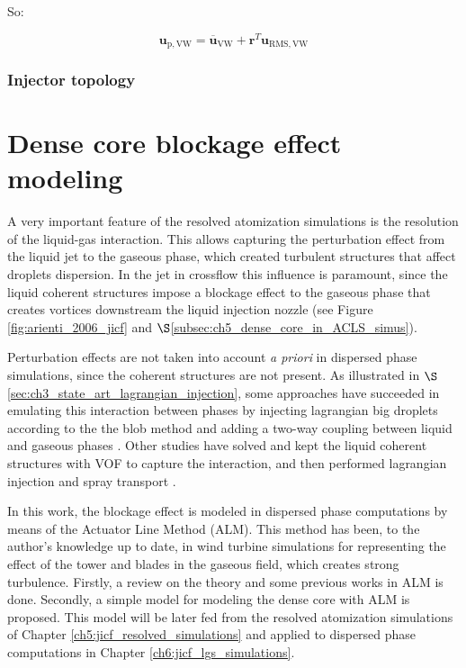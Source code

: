 So:

\begin{equation}
\boldsymbol{u}_\mathrm{p,VW} = \overline{\boldsymbol{u}}_\mathrm{VW}  + \boldsymbol{r}^T \boldsymbol{u}_\mathrm{RMS,VW} 
\end{equation}




\subsubsection*{Injector topology}



\section{Dense core blockage effect modeling}
	\label{sec:ch4_dense_core_modelling}
	
A very important feature of the resolved atomization simulations is the resolution of the liquid-gas interaction. This allows capturing the perturbation effect from the liquid jet to the gaseous phase, which created turbulent structures that affect droplets dispersion. In the jet in crossflow this influence is paramount, since the liquid coherent structures impose a blockage effect to the gaseous phase that creates vortices downstream the liquid injection nozzle (see Figure \ref{fig:arienti_2006_jicf} and $\S$\ref{subsec:ch5_dense_core_in_ACLS_simus}).

Perturbation effects are not taken into account \textsl{a priori} in dispersed phase simulations, since the coherent structures are not present. As illustrated in $\S$\ref{sec:ch3_state_art_lagrangian_injection}, some approaches have succeeded in emulating this interaction between phases by injecting lagrangian big droplets according to the the blob method  and adding a two-way coupling between liquid and gaseous phases . Other studies have solved and kept the liquid coherent structures with VOF to capture the interaction, and then performed lagrangian injection and spray transport .

In this work, the blockage effect is modeled in dispersed phase computations by means of the Actuator Line Method (ALM). This method has been, to the author's knowledge up to date, in wind turbine simulations for representing the effect of the tower and blades in the gaseous field, which creates strong turbulence. Firstly, a review on the theory and some previous works in ALM is done. Secondly, a simple model for modeling the dense core with ALM is proposed. This model will be later fed from the resolved atomization simulations of Chapter \ref{ch5:jicf_resolved_simulations} and applied to dispersed phase computations in Chapter \ref{ch6:jicf_lgs_simulations}.


